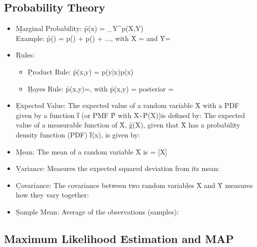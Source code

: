\subsection{Probability Theory}
\begin{itemize}
    \item \b{Marginal Probability:} \f{p(x) = \sum_{Y}^{}p(X,Y)}\\
    Example: \f{p() = p() + p() + ...}, with \f{X = } and \f{Y=}
    \item \b{Rules:}
    \begin{itemize}
        \item \b{Product Rule:} \f{p(x,y) = p(y|x)p(x)}
        \item \b{Bayes Rule:} \f{p(x,y)=,\quad} with \f{p(x,y) = posterior = }
    \end{itemize}
    \item \b{Expected Value:} The expected value of a random variable \f{X} with a PDF given by a function \f{f} (or PMF \f{P} with \f{X\sim P(X)})is defined by:
    The expected value of a measurable function of \f{X}, \f{g(X)}, given that \f{X} has a probability density function (PDF) \f{f(x)}, is given by:
    \item \b{Mean:} The mean of a random variable \f{X} is \f{\pmb{\mu} = [X]}
    \item \b{Variance:} Measures the expected squared deviation from its mean:
    \item \b{Covariance:} The covariance between two random variables \f{X} and \f{Y} measures how they vary together:
    \item \b{Sample Mean:} Average of the observations (samples):
\end{itemize}

\subsection{Maximum Likelihood Estimation and MAP}

